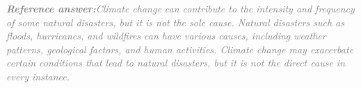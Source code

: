 \documentclass[a4paper,11pt]{article}
\begin{document}
\begin{refanswerenv}
{\footnotesize\textit{\textcolor{gray}{\textbf{Reference answer:}\enspace Climate change can contribute to the intensity and frequency of some natural disasters, but it is not the sole cause. Natural disasters such as floods, hurricanes, and wildfires can have various causes, including weather patterns, geological factors, and human activities. Climate change may exacerbate certain conditions that lead to natural disasters, but it is not the direct cause in every instance.}}}
\end{refanswerenv}
\end{document}
